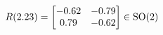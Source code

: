 \documentclass[preview]{standalone}
\begin{document}
\begin{align*}
\special{dvisvgm:raw <g id='unique000'>}R(2.23) = \begin{bmatrix} -0.62 & -0.79 \\ 0.79 & -0.62 \end{bmatrix} \in \text{SO}(2)\special{dvisvgm:raw </g>}
\end{align*}
\end{document}
